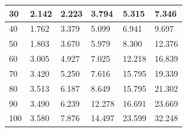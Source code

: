 \begin{table}[htp]
\begin{tabular}{|l|l|l|l|l|l|}
30                               & 2.142           & 2.223            & 3.794            & 5.315            & 7.346            \\ \hline
40                               & 1.762           & 3.379            & 5.099            & 6.941            & 9.697            \\ \hline
50                               & 1.803           & 3.670            & 5.979            & 8.300            & 12.376           \\ \hline
60                               & 3.005           & 4.927            & 7.025            & 12.218           & 16.839           \\ \hline
70                               & 3.420           & 5.250            & 7.616            & 15.795           & 19.339           \\ \hline
80                               & 3.513           & 6.187            & 8.649            & 15.795           & 21.302           \\ \hline
90                               & 3.490           & 6.239            & 12.278           & 16.691           & 23.669           \\ \hline
100                              & 3.580           & 7.876            & 14.497           & 23.599           & 32.248           \\ \hline
\end{tabular}
\end{table}


